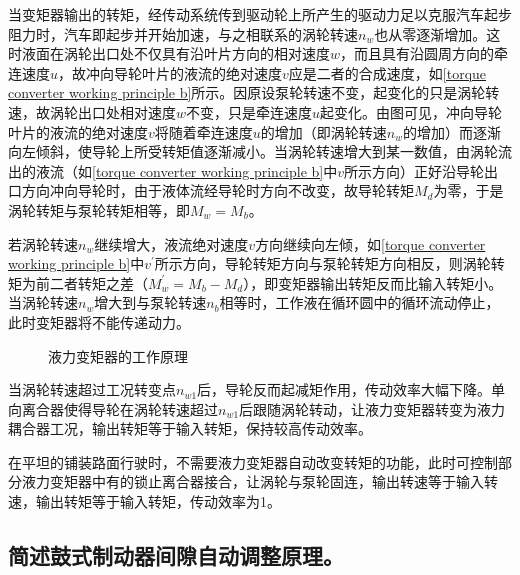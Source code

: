 \documentclass[UTF8]{ctexart}
\numberwithin{figure}{section}
\numberwithin{table}{section}
\begin{document}
当变矩器输出的转矩，经传动系统传到驱动轮上所产生的驱动力足以克服汽车起步阻力时，汽车即起步并开始加速，与之相联系的涡轮转速$n_w$也从零逐渐增加。这时液面在涡轮出口处不仅具有沿叶片方向的相对速度$w$，而且具有沿圆周方向的牵连速度$u$，故冲向导轮叶片的液流的绝对速度$v$应是二者的合成速度，如\cref{torque converter working principle b}所示。因原设泵轮转速不变，起变化的只是涡轮转速，故涡轮出口处相对速度$w$不变，只是牵连速度$u$起变化。由图可见，冲向导轮叶片的液流的绝对速度$v$将随着牵连速度$u$的增加（即涡轮转速$n_w$的增加）而逐渐向左倾斜，使导轮上所受转矩值逐渐减小。当涡轮转速增大到某一数值，由涡轮流出的液流（如\cref{torque converter working principle b}中$v$所示方向）正好沿导轮出口方向冲向导轮时，由于液体流经导轮时方向不改变，故导轮转矩$M_d$为零，于是涡轮转矩与泵轮转矩相等，即$M_w = M_b$。

若涡轮转速$n_w$继续增大，液流绝对速度$v$方向继续向左倾，如\cref{torque converter working principle b}中$v^{\prime}$所示方向，导轮转矩方向与泵轮转矩方向相反，则涡轮转矩为前二者转矩之差（$M_w^{\prime} = M_b-M_d$），即变矩器输出转矩反而比输入转矩小。当涡轮转速$n_w$增大到与泵轮转速$n_b$相等时，工作液在循环圆中的循环流动停止，此时变矩器将不能传递动力。

\begin{figure}[htbp]
	\centering
	\begin{minipage}[b]{0.8\textwidth}
		\centering
		\caption{液力变矩器的工作原理}
		\label{torque converter working principle}
	\end{minipage}
\end{figure}

当涡轮转速超过工况转变点$n_{w1}$后，导轮反而起减矩作用，传动效率大幅下降。单向离合器使得导轮在涡轮转速超过$n_{w1}$后跟随涡轮转动，让液力变矩器转变为液力耦合器工况，输出转矩等于输入转矩，保持较高传动效率。

在平坦的铺装路面行驶时，不需要液力变矩器自动改变转矩的功能，此时可控制部分液力变矩器中有的锁止离合器接合，让涡轮与泵轮固连，输出转速等于输入转速，输出转矩等于输入转矩，传动效率为1。

\subsection{简述鼓式制动器间隙自动调整原理。}
\end{document}
